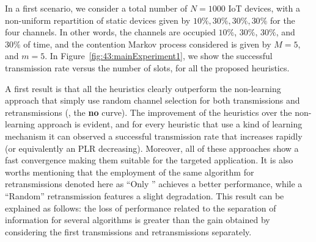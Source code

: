 In a first scenario, we consider a total number of $N=1000$ IoT devices, with a non-uniform repartition of static devices given by $10\%,30\%,30\%,30\%$ for the four channels.
In other words, the channels are occupied $10\%$, $30\%$, $30\%$, and $30\%$ of time, and the contention Markov process considered is given by $M = 5$, and $m=5$.
In Figure~\ref{fig:43:mainExperiment1}, we show the successful transmission rate versus the number of slots, for all the proposed heuristics.

A first result is that all the heuristics clearly outperform the non-learning approach that simply use random channel selection for both transmissions and retransmissions (\ie, the \textbf{no \UCB{}} curve).
The improvement of the heuristics over the non-learning approach is evident, and for every heuristic that use a kind of learning mechanism it can observed a successful transmission rate that increases rapidly (or equivalently an PLR decreasing).
Moreover, all of these approaches show a fast convergence making them suitable for the targeted application.
It is also worths mentioning that the employment of the same \UCB{} algorithm for retransmissions denoted here as ``Only \UCB{}'' achieves a better performance, while a ``Random'' retransmission features a slight degradation. This result can be explained as follows: the loss of performance related to the separation of information for several algorithms is greater than the gain obtained by considering the first transmissions and retransmissions separately.

